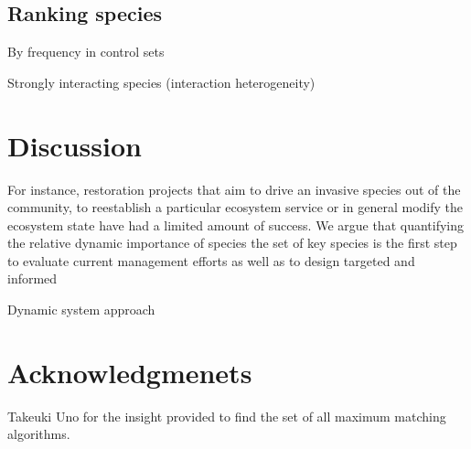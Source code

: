 \subsection*{Ranking species}

By frequency in control sets

Strongly interacting species (interaction heterogeneity)

\section*{Discussion}

 For instance, restoration projects that aim to drive an invasive species out of the community, to reestablish a particular ecosystem service or in general modify the ecosystem state have had a limited amount of success. We argue that quantifying the relative dynamic importance of species the set of key species is the first step to evaluate current management efforts as well as to design targeted and informed 
 
 Dynamic system approach
 
\section*{Acknowledgmenets}

Takeuki Uno for the insight provided to find the set of all maximum matching algorithms.



